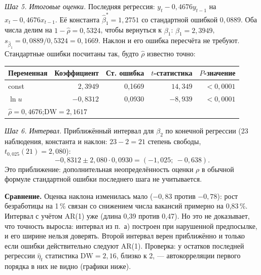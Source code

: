 \begin{solution}
\smallskip
\emph{Шаг 5. Итоговые оценки.} Последняя регрессия:
$y_t - 0{,}4676y_{t-1}$ на $x_t - 0{,}4676x_{t-1}$. Её константа
$\widehat\beta_1^* = 1{,}2751$ со стандартной ошибкой $0{,}0889$. Оба числа
делим на $1 - \widehat\rho = 0{,}5324$, чтобы вернуться к $\beta_1$:
$\widehat\beta_1 = 2{,}3949$, $s_{\widehat\beta_1} = 0{,}0889/0{,}5324 =
0{,}1669$. Наклон и его ошибка пересчёта не требуют. Стандартные ошибки
посчитаны так, будто $\widehat\rho$ известно точно:
\begin{center}
\begin{tabular*}{\linewidth}{@{\extracolsep{\fill}}lrrrr@{}}
\toprule
Переменная & Коэффициент & Ст. ошибка & $t$-статистика & $P$-значение \\
\midrule
const   & $\phantom{-}2{,}3949$ & 0,1669 & $14{,}349$ & $<0{,}0001$ \\
$\ln u$ & $-0{,}8312$ & 0,0930 & $-8{,}939$ & $<0{,}0001$ \\
\midrule
\multicolumn{5}{l}{$\widehat\rho=0{,}4676$;\quad $\mathrm{DW} = 2{,}1617$} \\
\bottomrule
\end{tabular*}
\end{center}

\noindent\begin{minipage}{\linewidth}
\emph{Шаг 6. Интервал.} Приближённый интервал для $\beta_2$ по конечной регрессии
(23 наблюдения, константа и наклон: $23-2=21$ степень свободы,
$t_{0{,}025}(21)=2{,}080$):
\[
  -0{,}8312 \pm 2{,}080\cdot 0{,}0930 = (-1{,}025;\ -0{,}638).
\]
Это приближение: дополнительная неопределённость оценки $\rho$
в обычной формуле стандартной ошибки последнего шага не учитывается.
\end{minipage}

\medskip
\noindent\begin{minipage}{\linewidth}
\textbf{Сравнение.}
\intervalvisual
Оценка наклона изменилась мало ($-0{,}83$ против $-0{,}78$): рост
безработицы на 1\,\% связан со снижением числа вакансий примерно на
0,83\,\%. Интервал с учётом AR(1) уже (длина 0,39 против 0,47). Но это не
доказывает, что точность выросла: интервал из п.~а) построен при нарушенной
предпосылке, и его ширине нельзя доверять. Второй интервал верен
приближённо и только если ошибки действительно следуют AR(1). Проверка:
у остатков последней регрессии $\widehat\eta_t$ статистика
$\mathrm{DW} = 2{,}16$, близко к 2, — автокорреляции первого порядка в них
не видно (графики ниже).
\end{minipage}
\arresidualvisual
\end{solution}

